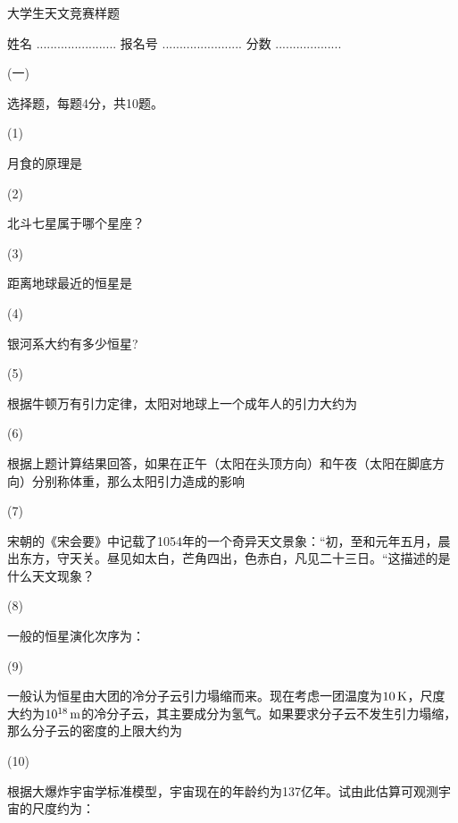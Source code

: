 \documentclass[12pt,CJK]{article}
\begin{document}
\bch
{\large 大学生天文竞赛样题}


姓名 ....................... {\hskip 0.3in}    报名号 .......................{\hskip 0.3in}  分数 ...................


\bitem
\item[(一)]{ 选择题，每题4分，共10题。

  \bitem
\item[(1)]{月食的原理是 \bropt
  
}
\item[(2)]{北斗七星属于哪个星座？ \bropt

}  
  
\item[(3)]{距离地球最近的恒星是 \bropt
  
}
\item[(4)]{银河系大约有多少恒星? \bropt
  
  }

\item[(5)]{根据牛顿万有引力定律，太阳对地球上一个成年人的引力大约为 \bropt

  \optlist{$30\SIN$}{$3\SIN$}{$0.3\SIN$}{$0.03\SIN$}}
\item[(6)]{根据上题计算结果回答，如果在正午（太阳在头顶方向）和午夜（太阳在脚底方向）分别称体重，那么太阳引力造成的影响 \bropt

  }
  
  
\item[(7)]{宋朝的《宋会要》中记载了1054年的一个奇异天文景象：“初，至和元年五月，晨出东方，守天关。昼见如太白，芒角四出，色赤白，凡见二十三日。“这描述的是什么天文现象？ \bropt

}
\item[(8)]{一般的恒星演化次序为： \bropt
  
}


\item[(9)]{一般认为恒星由大团的冷分子云引力塌缩而来。现在考虑一团温度为$10\,\mathrm{K}$，尺度大约为$10^{18}\,\mathrm{m}$的冷分子云，其主要成分为氢气。如果要求分子云不发生引力塌缩，那么分子云的密度的上限大约为 \bropt

}
  
\item[(10)]{根据大爆炸宇宙学标准模型，宇宙现在的年龄约为137亿年。试由此估算可观测宇宙的尺度约为： \bropt
  
  }
  
  \eitem
  }
\end{document}
